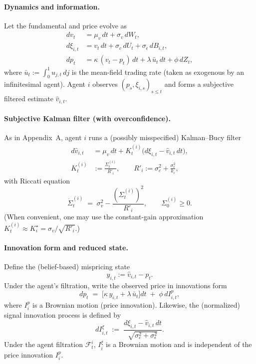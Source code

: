 \paragraph{Dynamics and information.}
Let the fundamental and price evolve as
\begin{align}
dv_t &= \mu_v\,dt + \sigma_v\,dW_t, \label{eq:v_dyn_ct}\\
d\xi_{i,t} &= v_t\,dt + \sigma_c\,dU_t + \sigma_\epsilon\,dB_{i,t}, \label{eq:xi_dyn_ct}\\
dp_t &= \kappa\,(v_t - p_t)\,dt + \lambda\,\bar u_t\,dt + \phi\,dZ_t, \label{eq:p_dyn_ct}
\end{align}
where $\bar u_t := \int_0^1 u_{j,t}\,dj$ is the mean-field trading rate (taken as exogenous by an infinitesimal agent).
Agent $i$ observes $(p_s,\xi_{i,s})_{s\le t}$ and forms a subjective filtered estimate $\hat v_{i,t}$.

\paragraph{Subjective Kalman filter (with overconfidence).}
As in Appendix~A, agent $i$ runs a (possibly misspecified) Kalman--Bucy filter
\begin{equation}
\begin{aligned}
d\hat v_{i,t}
&= \mu_v\,dt + K_t^{(i)}\bigl(d\xi_{i,t}-\hat v_{i,t}\,dt\bigr),\\
K_t^{(i)} &:= \frac{\Sigma_t^{(i)}}{R'_i},\qquad
R'_i := \sigma_c^2+\frac{\sigma_\epsilon^2}{k_i},
\end{aligned}
\label{eq:kb_filter_ct}
\end{equation}
with Riccati equation
\begin{equation}
\dot\Sigma_t^{(i)} \;=\; \sigma_v^2 - \frac{(\Sigma_t^{(i)})^2}{R'_i},
\qquad \Sigma_0^{(i)}\ge 0.
\label{eq:riccati_ct}
\end{equation}
(When convenient, one may use the constant-gain approximation $K_t^{(i)}\approx K_i^\star
= \sigma_v/\sqrt{R'_i}$.)

\paragraph{Innovation form and reduced state.}
Define the (belief-based) mispricing state
\begin{equation}
y_{i,t} := \hat v_{i,t}-p_t.
\label{eq:y_def}
\end{equation}
Under the agent's filtration, write the observed price in innovations form
\begin{equation}
dp_t \;=\; \bigl[\kappa\,y_{i,t}+\lambda\,\bar u_t\bigr]dt \;+\; \phi\,dI^p_{i,t},
\label{eq:p_innov}
\end{equation}
where $I^p_{i}$ is a Brownian motion (price innovation).
Likewise, the (normalized) signal innovation process is defined by
\[
dI^\xi_{i,t} \;:=\; \frac{d\xi_{i,t}-\hat v_{i,t}\,dt}{\sqrt{\sigma_c^2+\sigma_\epsilon^2}}.
\]
Under the agent filtration $\mathcal F^i_t$, $I^\xi_i$ is a Brownian motion and is independent of the price innovation $I^p_i$.

